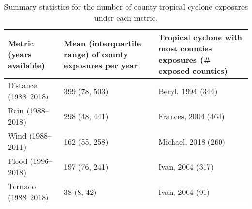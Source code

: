 \begin{table}[ht]
\centering
\caption{Summary statistics for the number of county tropical cyclone exposures under each metric.} 
\label{tab:exposuresummaries}
\begin{tabular}{p{4.5cm}p{4.5cm}p{4.5cm}}
  \toprule
Metric (years available) & Mean (interquartile range) of county exposures per year & Tropical cyclone with most counties exposures (\# exposed counties) \\ 
  \midrule
Distance (1988--2018) & 399 (78, 503) & Beryl, 1994 (344) \\ 
  Rain (1988--2018) & 298 (48, 441) & Frances, 2004 (464) \\ 
  Wind (1988--2011) & 162 (55, 258) & Michael, 2018 (260) \\ 
  Flood (1996--2018) & 197 (76, 241) & Ivan, 2004 (317) \\ 
  Tornado (1988--2018) & 38 (8, 42) & Ivan, 2004 (91) \\ 
   \bottomrule
\end{tabular}
\end{table}
